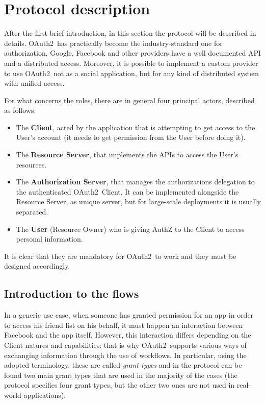 \documentclass[a4paper,12pt]{article}
\def\oauth{OAuth2\xspace}
\begin{document}
\section{Protocol description}
After the first brief introduction, in this section the protocol will be described in details. \oauth\ has practically become the industry-standard one for authorization. Google, Facebook and other providers have a well documented API and a distributed access. Moreover, it is possible to implement a custom provider to use \oauth\ not as a social application, but for any kind of distributed system with unified access.

For what concerns the roles, there are in general four principal actors, described as follows:


\begin{itemize}
    \item The \textbf{Client}, acted by the application that is attempting to get access to the User's account (it needs to get permission from the User before doing it).
    \item The \textbf{Resource Server}, that implements the APIs to access the User's resources.
    \item The \textbf{Authorization Server}, that manages the authorizations delegation to the authenticated \oauth\ Client. It can be implemented alongside the Resource Server, as unique server, but for large-scale deployments it is usually separated.
    \item The \textbf{User} (Resource Owner) who is giving AuthZ to the Client to access personal information.
\end{itemize}

It is clear that they are mandatory for \oauth\ to work and they must be designed accordingly. 

\subsection{Introduction to the flows}
\label{section22}
In a generic use case, when someone has granted permission for an app in order to access his friend list on his behalf, it must happen an interaction between Facebook and the app itself. However, this interaction differs depending on the Client natures and capabilities: that is why \oauth\ supports various ways of exchanging information through the use of workflows.
In particular, using the adopted terminology, these are called \textit{grant types} and in the protocol can be found two main grant types that are used in the majority of the cases (the protocol specifies four grant types, but the other two ones are not used in real-world applications):
\end{document}
